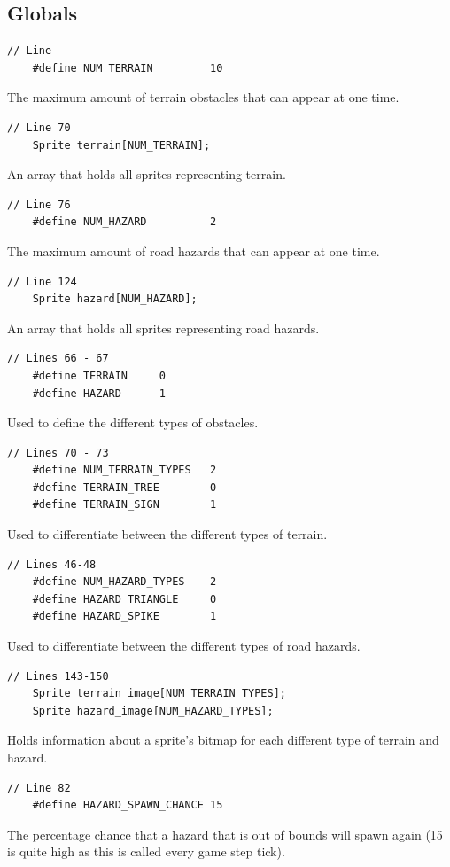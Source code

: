 \documentclass{article}
\begin{document}
\subsection*{Globals}
\begin{lstlisting}[style=CStyle]
	// Line 
	#define NUM_TERRAIN         10
\end{lstlisting}
The maximum amount of terrain obstacles that can appear at one time.
\begin{lstlisting}[style=CStyle]
	// Line 70
	Sprite terrain[NUM_TERRAIN]; 
\end{lstlisting}
An array that holds all sprites representing terrain.
\begin{lstlisting}[style=CStyle]
	// Line 76
	#define NUM_HAZARD          2
\end{lstlisting}
The maximum amount of road hazards that can appear at one time. 
\begin{lstlisting}[style=CStyle]
	// Line 124
	Sprite hazard[NUM_HAZARD];
\end{lstlisting}
An array that holds all sprites representing road hazards.
\begin{lstlisting}[style=CStyle]
	// Lines 66 - 67
	#define TERRAIN     0
	#define HAZARD      1
\end{lstlisting}
Used to define the different types of obstacles.
\begin{lstlisting}[style=CStyle]
	// Lines 70 - 73
	#define NUM_TERRAIN_TYPES   2
	#define TERRAIN_TREE        0
	#define TERRAIN_SIGN        1
\end{lstlisting}
Used to differentiate between the different types of terrain.
\begin{lstlisting}[style=CStyle]
	// Lines 46-48
	#define NUM_HAZARD_TYPES    2
	#define HAZARD_TRIANGLE     0
	#define HAZARD_SPIKE        1
\end{lstlisting}
Used to differentiate between the different types of road hazards.
\begin{lstlisting}[style=CStyle]
	// Lines 143-150
	Sprite terrain_image[NUM_TERRAIN_TYPES];
	Sprite hazard_image[NUM_HAZARD_TYPES];
\end{lstlisting}
Holds information about a sprite's bitmap for each different type of terrain and hazard.
\newpage
\begin{lstlisting}[style=CStyle]
	// Line 82
	#define HAZARD_SPAWN_CHANCE 15
\end{lstlisting}
The percentage chance that a hazard that is out of bounds will spawn again (15 is quite high as this is called every game step tick).
\end{document}
